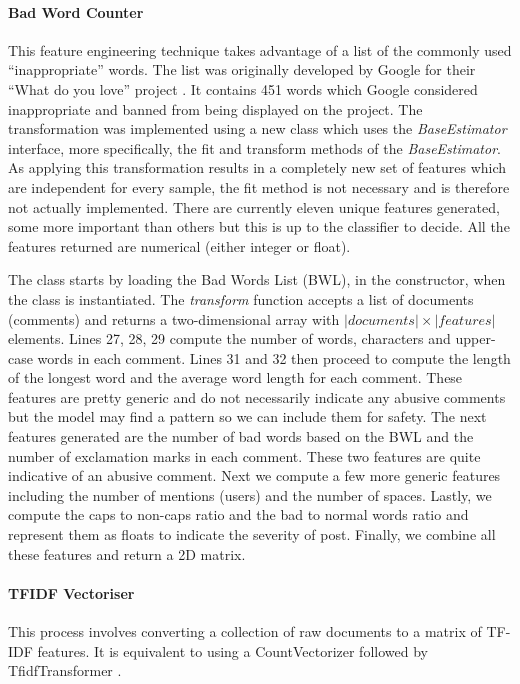 \paragraph{Bad Word Counter} This feature engineering technique takes advantage of a list of the commonly used ``inappropriate'' words. The list was originally developed by Google for their ``What do you love'' project \cite{GitHub:GoogleBadWordList}. It contains 451 words which Google considered inappropriate and banned from being displayed on the project. The transformation was implemented using a new class which uses the \emph{BaseEstimator} interface, more specifically, the fit and transform methods of the \emph{BaseEstimator}. As applying this transformation results in a completely new set of features which are independent for every sample, the fit method is not necessary and is therefore not actually implemented. There are currently eleven unique features generated, some more important than others but this is up to the classifier to decide. All the features returned are numerical (either integer or float).

The class starts by loading the Bad Words List (BWL), in the constructor, when the class is instantiated. The \emph{transform} function accepts a list of documents (comments) and returns a two-dimensional array with $|documents| \times |features|$ elements. Lines 27, 28, 29 compute the number of words, characters and upper-case words in each comment. Lines 31 and 32 then proceed to compute the length of the longest word and the average word length for each comment. These features are pretty generic and do not necessarily indicate any abusive comments but the model may find a pattern so we can include them for safety. The next features generated are the number of bad words based on the BWL and the number of exclamation marks in each comment. These two features are quite indicative of an abusive comment. Next we compute a few more generic features including the number of mentions (users) and the number of spaces. Lastly, we compute the caps to non-caps ratio and the bad to normal words ratio and represent them as floats to indicate the severity of post. Finally, we combine all these features and return a 2D matrix.

\paragraph{TFIDF Vectoriser} This process involves converting a collection of raw documents to a matrix of TF-IDF features. It is equivalent to using a CountVectorizer followed by TfidfTransformer \cite{Scikit:TFIDFVectorizer}. 

